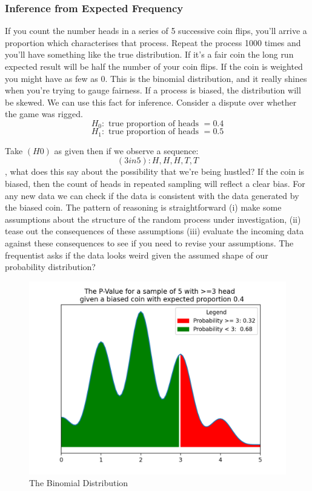\documentclass[10pt,a4paper,notitlepage, twocolumn]{article}
\begin{document}
\subsubsection*{Inference from Expected Frequency}
If you count the number heads in a series of 5 successive coin flips, you'll arrive a proportion which characterises that process. Repeat the process 1000 times and you'll have something like the true distribution. If it's a fair coin the long run expected result will be half the number of your coin flips. If the coin is weighted you might have as few as 0. This is the binomial distribution, and it really shines when you're trying to gauge fairness. If a process is biased, the distribution will be skewed. We can use this fact for inference. Consider a dispute over whether the game was rigged. 
$$ H_0 : \text{ true proportion of heads } = 0.4  $$
$$ H_1 : \text{ true proportion of heads } =  0.5 $$

\noindent Take $(H0)$ as given then if we observe a sequence: $$ (3in5): H, H, H, T, T$$, what does this say about the possibility that we're being hustled? If the coin is biased, then the count of heads in repeated sampling will reflect a clear bias. For any new data we can check if the data is consistent with the data generated by the biased coin. The pattern of reasoning is straightforward (i) make some assumptions about the structure of the random process under investigation, (ii) tease out the consequences of these assumptions (iii) evaluate the incoming data against these consequences to see if you need to revise your assumptions. The frequentist asks if the data looks weird given the assumed shape of our probability distribution?

\begin{figure}[H]
  \includegraphics[width=\linewidth]{./Plots/binomial_test.png}
  \caption{The Binomial Distribution}
\end{figure}
\end{document}
